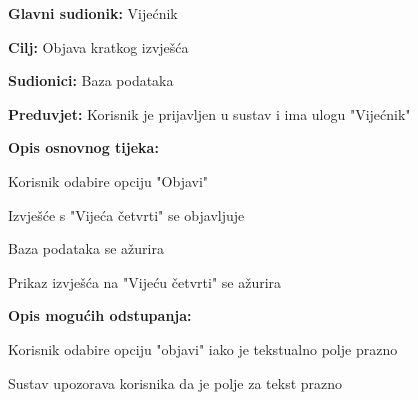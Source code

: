 					\noindent {}
					\begin{packed_item}
	
						\item \textbf{Glavni sudionik: }Vijećnik
						\item  \textbf{Cilj:} Objava kratkog izvješća
						\item  \textbf{Sudionici:} Baza podataka
						\item  \textbf{Preduvjet:} Korisnik je prijavljen u sustav i ima ulogu "Vijećnik"
						\item  \textbf{Opis osnovnog tijeka:}
						
						\item[] \begin{packed_enum}
	
							\item Korisnik odabire opciju "Objavi" 
							\item Izvješće s "Vijeća četvrti" se objavljuje
							\item Baza podataka se ažurira
							\item Prikaz izvješća na "Vijeću četvrti" se ažurira	
							
							
						\end{packed_enum}
						\item  \textbf{Opis mogućih odstupanja:}
						
						\item[] \begin{packed_item}
						\item[2.a] Korisnik odabire opciju "objavi" iako je tekstualno polje prazno
							\item[] \begin{packed_enum}
								
								\item Sustav upozorava korisnika da je polje za tekst prazno
								
							\end{packed_enum}
						\end{packed_item}
						\end{packed_item}
						
